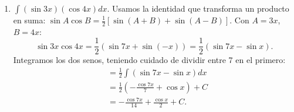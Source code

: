 \documentclass[12pt, letterpaper]{article}
\makeatletter
\renewcommand{\alph}[1]{\expandafter\@alphlatin\csname c@#1\endcsname}
\newcommand{\@alphlatin}[1]{\ifcase#1\or a\or b\or c\or d\or e\or f\or g\or h\or i\or j\or k\or l\or m\or n\or o\or p\or q\or r\or s\or t\or u\or v\or w\or x\or y\or z\else\@ctrerr\fi}
\makeatother
\begin{document}
\begin{enumerate}[label=\alph*)]
\[\begin{aligned}
  &=\boxed{\frac{\sec^7x}{7}-\frac{\sec^5x}{5}+C}.
  \end{aligned}
  \]
  \item $\displaystyle\int(\sin3x)(\cos4x)dx$. Usamos la identidad que transforma un producto en suma: $\sin A\cos B=\frac12[\sin(A+B)+\sin(A-B)]$. Con $A=3x$, $B=4x$:
  \[
  \sin3x\cos4x=\frac12(\sin7x+\sin(-x))=\frac12(\sin7x-\sin x).
  \]
  Integramos los dos senos, teniendo cuidado de dividir entre 7 en el primero:
  \[
  \begin{aligned}
  &=\frac12\int(\sin7x-\sin x)dx\\
  &=\frac12\left(-\frac{\cos7x}{7}+\cos x\right)+C\\
  &=\boxed{-\frac{\cos7x}{14}+\frac{\cos x}{2}+C}.
  \end{aligned}
  \]
\end{enumerate}
\end{document}
